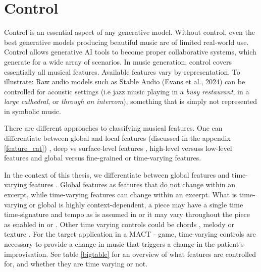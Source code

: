 \section{Control} \label{section:control}
Control is an essential aspect of any generative model. Without control, even the best generative models producing beautiful music are of limited real-world use. Control allows generative AI tools to become proper collaborative systems, which generate for a wide array of scenarios. In music generation, control covers essentially all musical features. Available features vary by representation. To illustrate:
Raw audio models such as Stable Audio (Evans et al., 2024) can be controlled for acoustic settings (i.e jazz music playing in a \textit{busy restaurant}, in a \textit{large cathedral}, or \textit{through an intercom}), something that is simply not represented in symbolic music. 

There are different approaches to classifying musical features. 
One can differentiate between global and local features (discussed in the appendix \ref{feature_cat}) \cite{Van_Kranenburg_Volk_Wiering_2013}, 
deep vs surface-level features \cite{Blacking_1971}, high-level versuss low-level features \cite{Tan_Herremans_2020} and global versus fine-grained or time-varying features. 

In the context of this thesis, we differentiate between global features and time-varying features \cite{Rütte_figaro_2023}. Global features as features that do not change within an excerpt, while time-varying features can change within an excerpt. What is time-varying or global is highly context-dependent, a piece may have a single time time-signature and tempo as is assumed in \cite{Lu_Xu_Kang_Yu_Xing_Tan_Bian_MuseCoco_2023} or it may vary throughout the piece as enabled in \cite{Rütte_figaro_2023} or \cite{Huang_Yang_remi_pop_transformer_2020}. Other time varying controls could be chords \cite{Rütte_figaro_2023}\cite{Wu_Donahue_musicontrolnet_2023}\cite{Lan_Hsiao_Cheng_Yang_musicongen_2024}\cite{Min_Jiang_Xia_Zhao_polyffusion_2023}, melody \cite{copet2023simple}\cite{Min_Jiang_Xia_Zhao_polyffusion_2023} or texture \cite{Min_Jiang_Xia_Zhao_polyffusion_2023}. For the target application in a MACT - game, time-varying controls are necessary to provide a change in music that triggers a change in the patient's improvisation. See table \ref{bigtable} for an overview of what features are controlled for, and whether they are time varying or not. 


